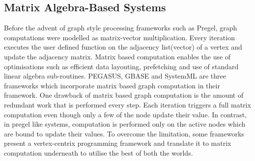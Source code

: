 \subsection{Matrix Algebra-Based Systems}
Before the advent of graph style processing frameworks such as Pregel, graph computations were modelled as matrix-vector multiplication. Every iteration executes the user defined function on the adjacency list(vector) of a vertex and update the adjacency matrix. Matrix based computation enables the use of optimisations such as efficient data layouting, prefetching and use of standard linear algebra sub-routines. PEGASUS, GBASE and SystemML are three frameworks which incorporate matrix based graph computation in their framework. One drawback of matrix based graph computation is the amount of redundant work that is performed every step. Each iteration triggers a full matrix computation even though only a few of the node update their value. In contrast, in pregel like systems, computation is performed only on the active nodes which are bound to update their values. To overcome the limitation, some frameworks present a vertex-centrix programming framework and translate it to matrix computation underneath to utilise the best of both the worlds.